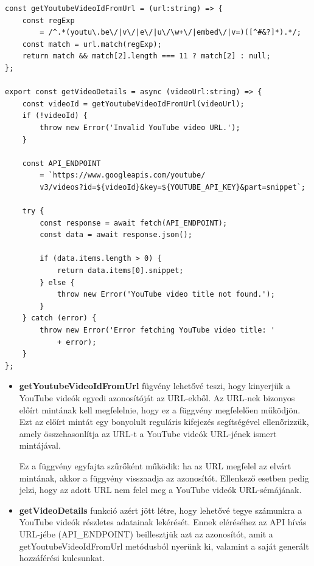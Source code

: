 \begin{lstlisting}[style=Csharp,caption={Youtube Data API használata}]
const getYoutubeVideoIdFromUrl = (url:string) => {
    const regExp 
        = /^.*(youtu\.be\/|v\/|e\/|u\/\w+\/|embed\/|v=)([^#&?]*).*/;
    const match = url.match(regExp);
    return match && match[2].length === 11 ? match[2] : null;
};

export const getVideoDetails = async (videoUrl:string) => {
    const videoId = getYoutubeVideoIdFromUrl(videoUrl);
    if (!videoId) {
        throw new Error('Invalid YouTube video URL.');
    }

    const API_ENDPOINT 
        = `https://www.googleapis.com/youtube/
        v3/videos?id=${videoId}&key=${YOUTUBE_API_KEY}&part=snippet`;

    try {
        const response = await fetch(API_ENDPOINT);
        const data = await response.json();

        if (data.items.length > 0) {
            return data.items[0].snippet;
        } else {
            throw new Error('YouTube video title not found.');
        }
    } catch (error) {
        throw new Error('Error fetching YouTube video title: '
            + error);
    }
};
\end{lstlisting}
\vspace{1em}
\begin{itemize}
\item \textbf{getYoutubeVideoIdFromUrl} fügvény lehetővé teszi, hogy kinyerjük a YouTube videók egyedi azonosítóját az URL-ekből. Az URL-nek bizonyos előírt mintának kell megfelelnie, hogy ez a függvény megfelelően működjön. Ezt az előírt mintát egy bonyolult reguláris kifejezés segítségével ellenőrizzük, amely összehasonlítja az URL-t a YouTube videók URL-jének ismert mintájával.

Ez a függvény egyfajta szűrőként működik: ha az URL megfelel az elvárt mintának, akkor a függvény visszaadja az azonosítót. Ellenkező esetben pedig jelzi, hogy az adott URL nem felel meg a YouTube videók URL-sémájának.

\item \textbf{getVideoDetails} funkció azért jött létre, hogy lehetővé tegye számunkra a YouTube videók részletes adatainak lekérését. Ennek eléréséhez az API hívás URL-jébe (API\_ENDPOINT) beillesztjük azt az azonosítót, amit a getYoutubeVideoIdFromUrl metódusból nyerünk ki, valamint a saját generált hozzáférési kulcsunkat.

\end{itemize}

